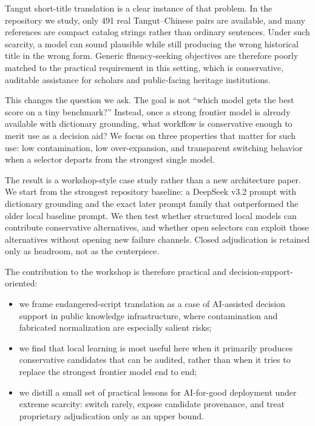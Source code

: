 \documentclass{article}
\begin{document}
Tangut short-title translation is a clear instance of that problem. In the repository we study, only 491 real Tangut--Chinese pairs are available, and many references are compact catalog strings rather than ordinary sentences. Under such scarcity, a model can sound plausible while still producing the wrong historical title in the wrong form. Generic fluency-seeking objectives are therefore poorly matched to the practical requirement in this setting, which is conservative, auditable assistance for scholars and public-facing heritage institutions.

This changes the question we ask. The goal is not ``which model gets the best score on a tiny benchmark?'' Instead, once a strong frontier model is already available with dictionary grounding, what workflow is conservative enough to merit use as a decision aid? We focus on three properties that matter for such use: low contamination, low over-expansion, and transparent switching behavior when a selector departs from the strongest single model.

The result is a workshop-style case study rather than a new architecture paper. We start from the strongest repository baseline: a DeepSeek v3.2 prompt with dictionary grounding and the exact later prompt family that outperformed the older local baseline prompt. We then test whether structured local models can contribute conservative alternatives, and whether open selectors can exploit those alternatives without opening new failure channels. Closed adjudication is retained only as headroom, not as the centerpiece.

The contribution to the workshop is therefore practical and decision-support-oriented:
\begin{itemize}
    \item we frame endangered-script translation as a case of AI-assisted decision support in public knowledge infrastructure, where contamination and fabricated normalization are especially salient risks;
    \item we find that local learning is most useful here when it primarily produces conservative candidates that can be audited, rather than when it tries to replace the strongest frontier model end to end;
    \item we distill a small set of practical lessons for AI-for-good deployment under extreme scarcity: switch rarely, expose candidate provenance, and treat proprietary adjudication only as an upper bound.
\end{itemize}
\end{document}
